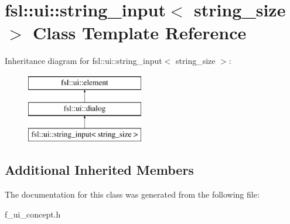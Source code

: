 \hypertarget{classfsl_1_1ui_1_1string__input}{}\section{fsl\+::ui\+::string\+\_\+input$<$ string\+\_\+size $>$ Class Template Reference}
\label{classfsl_1_1ui_1_1string__input}
Inheritance diagram for fsl\+::ui\+::string\+\_\+input$<$ string\+\_\+size $>$\+:\begin{figure}[H]
\begin{center}
\leavevmode
\includegraphics[height=3.000000cm]{classfsl_1_1ui_1_1string__input}
\end{center}
\end{figure}
\subsection*{Additional Inherited Members}


The documentation for this class was generated from the following file\+:\begin{DoxyCompactItemize}
\item 
f\+\_\+ui\+\_\+concept.\+h\end{DoxyCompactItemize}
